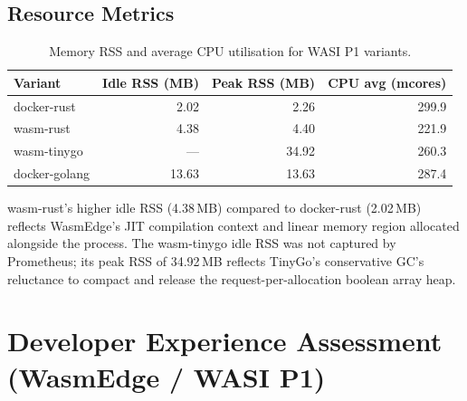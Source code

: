 \subsection{Resource Metrics}

\begin{table}[htbp]
    \centering
    \caption{Memory RSS and average CPU utilisation for WASI P1 variants.}
    \label{tab:app_resource_metrics}
    \begin{tabular}{lrrr}
        \hline
        \textbf{Variant} & \textbf{Idle RSS (MB)} & \textbf{Peak RSS (MB)} & \textbf{CPU avg (mcores)} \\
        \hline
        docker-rust   &  2.02 &  2.26 & 299.9 \\
        wasm-rust     &  4.38 &  4.40 & 221.9 \\
        wasm-tinygo   &   --- & 34.92 & 260.3 \\
        docker-golang & 13.63 & 13.63 & 287.4 \\
        \hline
    \end{tabular}
\end{table}

wasm-rust's higher idle \acs{RSS} (4.38\,MB) compared to docker-rust (2.02\,MB) reflects \acs{WasmEdge}'s \acs{JIT} compilation context and linear memory region allocated alongside the process. The wasm-tinygo idle \acs{RSS} was not captured by Prometheus; its peak \acs{RSS} of 34.92\,MB reflects TinyGo's conservative \acs{GC}'s reluctance to compact and release the request-per-allocation boolean array heap.

\section{Developer Experience Assessment (WasmEdge / WASI P1)}
\label{app:wasmedge_dx}

\begin{table}[htbp]
    \centering
    \caption{Developer experience friction for the WasmEdge WASI P1 variants.}
    \label{tab:app_dx_assessment}
\end{table}

